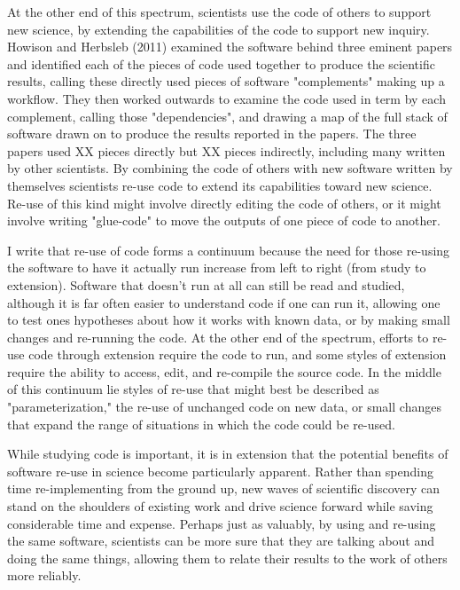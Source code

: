\documentclass{sigchi}
\begin{document}
At the other end of this spectrum, scientists use the code of others to support new science, by extending the capabilities of the code to support new inquiry. Howison and Herbsleb (2011) examined the software behind three eminent papers and identified each of the pieces of code used together to produce the scientific results, calling these directly used pieces of software "complements" making up a workflow. They then worked outwards to examine the code used in term by each complement, calling those "dependencies", and drawing a map of the full stack of software drawn on to produce the results reported in the papers. The three papers used XX pieces directly but XX pieces indirectly, including many written by other scientists. By combining the code of others with new software written by themselves scientists re-use code to extend its capabilities toward new science. Re-use of this kind might involve directly editing the code of others, or it might involve writing "glue-code" to move the outputs of one piece of code to another.

I write that re-use of code forms a continuum because the need for those re-using the software to have it actually run increase from left to right (from study to extension).  Software that doesn't run at all can still be read and studied, although it is far often easier to understand code if one can run it, allowing one to test ones hypotheses about how it works with known data, or by making small changes and re-running the code. At the other end of the spectrum, efforts to re-use code through extension require the code to run, and some styles of extension require the ability to access, edit, and re-compile the source code.  In the middle of this continuum lie styles of re-use that might best be described as "parameterization," the re-use of unchanged code on new data, or small changes that expand the range of situations in which the code could be re-used.

While studying code is important, it is in extension that the potential benefits of software re-use in science become particularly apparent. Rather than spending time re-implementing from the ground up, new waves of scientific discovery can stand on the shoulders of existing work and drive science forward while saving considerable time and expense. Perhaps just as valuably, by using and re-using the same software, scientists can be more sure that they are talking about and doing the same things, allowing them to relate their results to the work of others more reliably.
\end{document}
